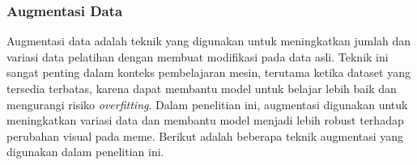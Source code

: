 





\subsubsection{Augmentasi Data} \label{II.teori11.3}
Augmentasi data adalah teknik yang digunakan untuk meningkatkan jumlah dan variasi data pelatihan dengan membuat modifikasi pada data asli. Teknik ini sangat penting dalam konteks pembelajaran mesin, terutama ketika dataset yang tersedia terbatas, karena dapat membantu model untuk belajar lebih baik dan mengurangi risiko \textit{overfitting}. Dalam penelitian ini, augmentasi digunakan untuk meningkatkan variasi data dan membantu model menjadi lebih robust terhadap perubahan visual pada meme. Berikut adalah beberapa teknik augmentasi yang digunakan dalam penelitian ini.

